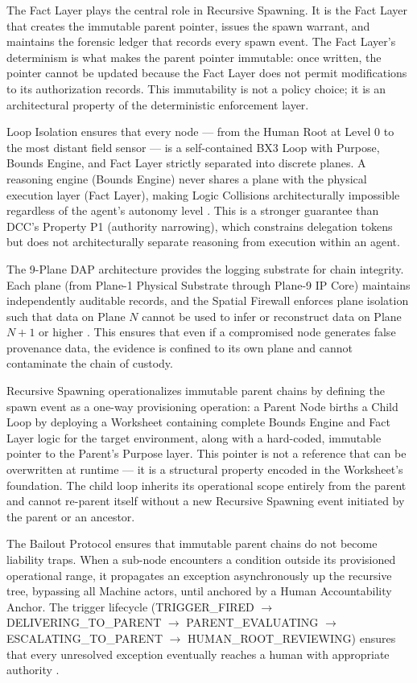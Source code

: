 The Fact Layer plays the central role in Recursive Spawning. It is the Fact Layer that creates the immutable parent pointer, issues the spawn warrant, and maintains the forensic ledger that records every spawn event. The Fact Layer's determinism is what makes the parent pointer immutable: once written, the pointer cannot be updated because the Fact Layer does not permit modifications to its authorization records. This immutability is not a policy choice; it is an architectural property of the deterministic enforcement layer.

Loop Isolation ensures that every node — from the Human Root at Level 0 to the most distant field sensor — is a self-contained BX3 Loop with Purpose, Bounds Engine, and Fact Layer strictly separated into discrete planes. A reasoning engine (Bounds Engine) never shares a plane with the physical execution layer (Fact Layer), making Logic Collisions architecturally impossible regardless of the agent's autonomy level \cite{bx3-universal-spec2026}. This is a stronger guarantee than DCC's Property P1 (authority narrowing), which constrains delegation tokens but does not architecturally separate reasoning from execution within an agent.

The 9-Plane DAP architecture provides the logging substrate for chain integrity. Each plane (from Plane-1 Physical Substrate through Plane-9 IP Core) maintains independently auditable records, and the Spatial Firewall enforces plane isolation such that data on Plane $N$ cannot be used to infer or reconstruct data on Plane $N+1$ or higher \cite{bx3-universal-arch2026}. This ensures that even if a compromised node generates false provenance data, the evidence is confined to its own plane and cannot contaminate the chain of custody.

Recursive Spawning operationalizes immutable parent chains by defining the spawn event as a one-way provisioning operation: a Parent Node births a Child Loop by deploying a Worksheet containing complete Bounds Engine and Fact Layer logic for the target environment, along with a hard-coded, immutable pointer to the Parent's Purpose layer. This pointer is not a reference that can be overwritten at runtime — it is a structural property encoded in the Worksheet's foundation. The child loop inherits its operational scope entirely from the parent and cannot re-parent itself without a new Recursive Spawning event initiated by the parent or an ancestor.

The Bailout Protocol ensures that immutable parent chains do not become liability traps. When a sub-node encounters a condition outside its provisioned operational range, it propagates an exception asynchronously up the recursive tree, bypassing all Machine actors, until anchored by a Human Accountability Anchor. The trigger lifecycle (TRIGGER\_FIRED $\rightarrow$ DELIVERING\_TO\_PARENT $\rightarrow$ PARENT\_EVALUATING $\rightarrow$ ESCALATING\_TO\_PARENT $\rightarrow$ HUMAN\_ROOT\_REVIEWING) ensures that every unresolved exception eventually reaches a human with appropriate authority \cite{bailoutprotocol2026,bx3-universal-spec2026}.

